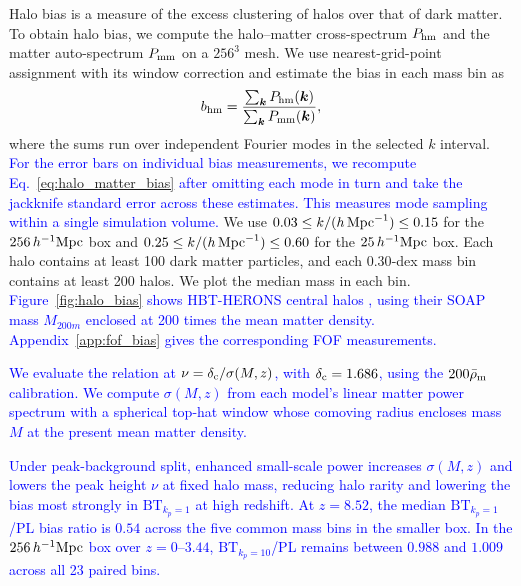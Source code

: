 \documentclass[
 reprint,
 superscriptaddress,
 nofootinbib,
 nobibnotes,
 amsmath,
 amssymb,
 aps,
 prd,
 floatfix,
 longbibliography
]{revtex4-2}
\DeclareRobustCommand{\change}[1]{\textcolor{blue}{#1}}
\DeclareRobustCommand{\BTKPone}{\ensuremath{\mathrm{BT}_{k_p=1}}}
\DeclareRobustCommand{\BTKPten}{\ensuremath{\mathrm{BT}_{k_p=10}}}
\begin{document}
Halo bias is a measure of the excess clustering of halos over that of dark matter. To obtain halo bias, we compute the halo--matter cross-spectrum \(P_{\rm hm}\) and the matter auto-spectrum \(P_{\rm mm}\) on a \(256^3\) mesh. We use nearest-grid-point assignment with its window correction and estimate the bias in each mass bin as
\begin{equation}
    b_{\rm hm} = \frac{\sum_{\boldsymbol{k}} P_{\rm hm}(\boldsymbol{k})}
                       {\sum_{\boldsymbol{k}} P_{\rm mm}(\boldsymbol{k})},
    \label{eq:halo_matter_bias}
\end{equation}
where the sums run over independent Fourier modes in the selected \(k\) interval. \change{For the error bars on individual bias measurements, we recompute Eq.~\eqref{eq:halo_matter_bias} after omitting each mode in turn and take the jackknife standard error across these estimates. This measures mode sampling within a single simulation volume.} We use \(0.03\leq k/(h\,{\rm Mpc}^{-1})\leq0.15\) for the \(256\,h^{-1}{\rm Mpc}\) box and \(0.25\leq k/(h\,{\rm Mpc}^{-1})\leq0.60\) for the \(25\,h^{-1}{\rm Mpc}\) box. Each halo contains at least 100 dark matter particles, and each \(0.30\)-dex mass bin contains at least 200 halos. We plot the median mass in each bin. \change{Figure~\ref{fig:halo_bias} shows \textsc{HBT-HERONS} central halos \citep{Han2018HBTPlus,Victor25HBTHERONS}, using their \textsc{SOAP} mass \(M_{200m}\) enclosed at 200 times the mean matter density. Appendix~\ref{app:fof_bias} gives the corresponding FOF measurements.}

\change{We evaluate the \citet{Tinker2010HaloBias} relation at \(\nu=\delta_{\rm c}/\sigma(M,z)\), with \(\delta_{\rm c}=1.686\), using the \(200\bar\rho_{\rm m}\) calibration. We compute \(\sigma(M,z)\) from each model's linear matter power spectrum with a spherical top-hat window whose comoving radius encloses mass \(M\) at the present mean matter density. }

\change{Under peak-background split, enhanced small-scale power increases \(\sigma(M,z)\) and lowers the peak height \(\nu\) at fixed halo mass, reducing halo rarity and lowering the bias most strongly in \BTKPone{} at high redshift. At \(z=8.52\), the median \BTKPone{}/PL bias ratio is \(0.54\) across the five common mass bins in the smaller box. In the \(256\,h^{-1}{\rm Mpc}\) box over \(z=0\)--\(3.44\), \BTKPten{}/PL remains between \(0.988\) and \(1.009\) across all 23 paired bins. }
\end{document}
